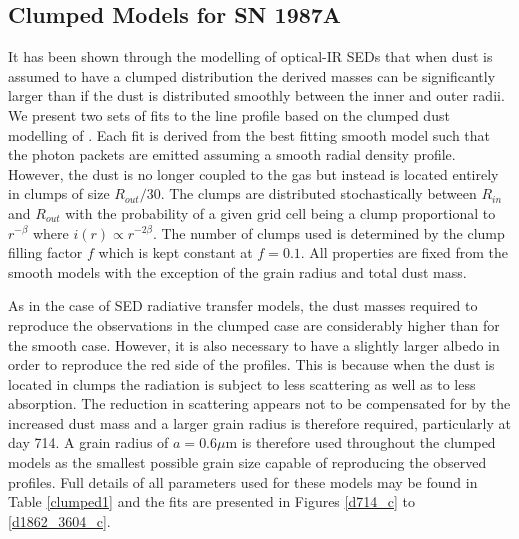 \subsection{Clumped Models for SN 1987A}
\label{clumped_models}


It has been shown through the modelling of optical-IR SEDs that when dust 
is assumed to have a clumped distribution the derived masses can be 
significantly larger than if the dust is distributed smoothly between the 
inner and outer radii.  We present two sets of fits to the line profile based on 
the clumped dust modelling of \citet{Wesson2015}.  Each fit is derived from the best 
fitting smooth model such that the photon packets are emitted assuming a smooth 
radial density profile.  However, the dust is no longer coupled to the gas 
but instead is located entirely in clumps of size $R_{out}/30$.  The 
clumps are distributed stochastically between $R_{in}$ and $R_{out}$ with 
the probability of a given grid cell being a clump proportional to $r^{- 
\beta }$ where $i(r) \propto r^{-2 \beta}$.  The number of clumps used is 
determined by the clump filling factor $f$ which is kept constant at $f=0.1$.  All 
properties are fixed from the smooth models with the exception of the grain 
radius and total dust mass.

As in the case of SED radiative transfer models, the dust masses required to reproduce the 
observations in the clumped case are considerably higher than for the smooth case.  
However, it is also necessary to have a slightly larger albedo in order to 
reproduce the red side of the profiles.  This is because when 
the dust is located in clumps the radiation is subject to less scattering 
as well as to less absorption.  The reduction in scattering appears not to be 
compensated for by the increased dust mass and a larger grain radius is 
therefore required, particularly at day 714.  A grain radius of $a=0.6\mu$m 
is therefore used throughout the clumped models as the smallest possible 
grain size capable of reproducing the observed profiles. Full details of all 
parameters used for these models may be found in Table \ref{clumped1} and 
the fits are presented in Figures \ref{d714_c} to \ref{d1862_3604_c}.


